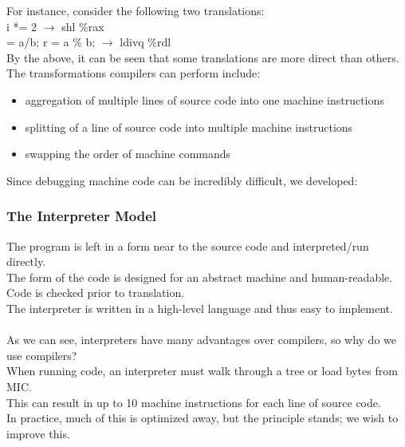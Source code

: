 \documentclass[../../lecture_notes.tex]{subfiles}
\begin{document}
For instance, consider the following two translations:\\
	\indent i *= 2 $\rightarrow$ shl \%rax\\
	 = a/b; r = a \% b; $\rightarrow$ ldivq \%rdl\\
By the above, it can be seen that some translations are more direct than others.\\
The transformations compilers can perform include: \begin{itemize} [itemsep=0mm]
	\item aggregation of multiple lines of source code into one machine instructions
	\item splitting of a line of source code into multiple machine instructions
	\item swapping the order of machine commands
\end {itemize}
Since debugging machine code can be incredibly difficult, we developed:\\

\subsubsection*{The Interpreter Model}
The program is left in a form near to the source code and interpreted/run directly.\\
The form of the code is designed for an abstract machine and human-readable.\\
Code is checked prior to translation.\\
The interpreter is written in a high-level language and thus easy to implement.\\
\\
As we can see, interpreters have many advantages over compilers, so why do we use compilers?\\
When running code, an interpreter must walk through a tree or load bytes from MIC.\\
This can result in up to 10 machine instructions for each line of source code.\\
In practice, much of this is optimized away, but the principle stands; we wish to improve this.\\
\end{document}
